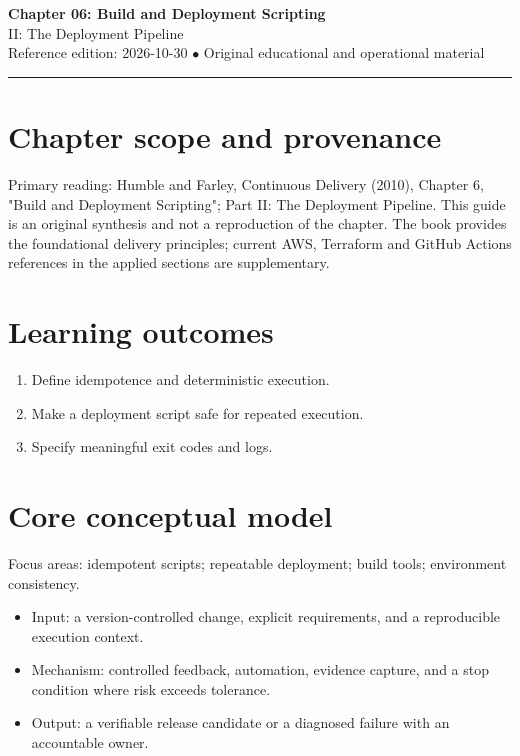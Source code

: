 \documentclass[10pt,letterpaper]{article}
\begin{document}
\begin{center}
{\LARGE\bfseries\color{cdblue}Chapter 06: Build and Deployment Scripting}\\[7pt]
{\large II: The Deployment Pipeline}\\[6pt]
{\small Reference edition: 2026-10-30 $\bullet$ Original educational and operational material}
\end{center}
\noindent\color{cdblue}\rule{\linewidth}{1.2pt}\color{black}
\vspace{0.4em}
\section{Chapter scope and provenance}
Primary reading: Humble and Farley, Continuous Delivery (2010), Chapter 6, "Build and Deployment Scripting"; Part II: The Deployment Pipeline. This guide is an original synthesis and not a reproduction of the chapter. The book provides the foundational delivery principles; current AWS, Terraform and GitHub Actions references in the applied sections are supplementary.


\section{Learning outcomes}
\begin{enumerate}
\item Define idempotence and deterministic execution.
\item Make a deployment script safe for repeated execution.
\item Specify meaningful exit codes and logs.
\end{enumerate}

\section{Core conceptual model}
Focus areas: idempotent scripts; repeatable deployment; build tools; environment consistency.

\begin{itemize}
\item Input: a version-controlled change, explicit requirements, and a reproducible execution context.
\item Mechanism: controlled feedback, automation, evidence capture, and a stop condition where risk exceeds tolerance.
\item Output: a verifiable release candidate or a diagnosed failure with an accountable owner.
\end{itemize}
\end{document}
